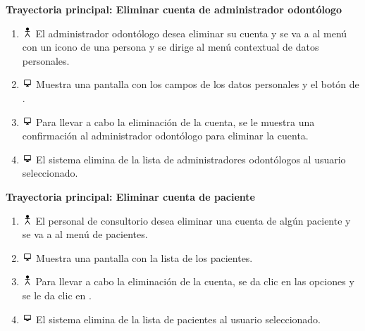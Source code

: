 \textbf{Trayectoria principal: Eliminar cuenta de administrador odontólogo}
\begin{enumerate}
\item \includegraphics[height=1em]{pictures/actor.png} El administrador odontólogo desea eliminar su cuenta y se va a al menú con un icono de una persona y se dirige al menú contextual de datos personales.
\item \includegraphics[height=1em]{pictures/sistema.png} Muestra una pantalla con los campos de los datos personales y el botón de  .
\item \includegraphics[height=1em]{pictures/sistema.png} Para llevar a cabo la eliminación de la cuenta, se le muestra una confirmación al administrador odontólogo para eliminar la cuenta.
\item \includegraphics[height=1em]{pictures/sistema.png} El sistema elimina de la lista de administradores odontólogos al usuario seleccionado.
\end{enumerate} \bigskip

\textbf{Trayectoria principal: Eliminar cuenta de paciente}
\begin{enumerate}
\item \includegraphics[height=1em]{pictures/actor.png} El personal de consultorio desea eliminar una cuenta de algún paciente y se va a al menú de pacientes.
\item \includegraphics[height=1em]{pictures/sistema.png} Muestra una pantalla con la lista de los pacientes.
\item \includegraphics[height=1em]{pictures/actor.png} Para llevar a cabo la eliminación de la cuenta, se da clic en las opciones y se le da clic en .
\item \includegraphics[height=1em]{pictures/sistema.png} El sistema elimina de la lista de pacientes al usuario seleccionado.
\end{enumerate} \bigskip


